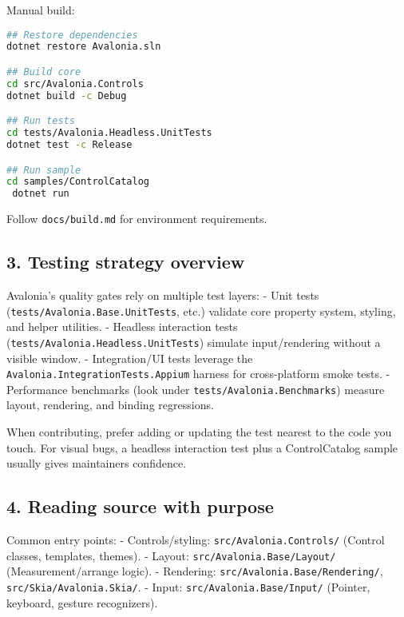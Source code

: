 Manual build:

\begin{lstlisting}[language=bash]
## Restore dependencies
dotnet restore Avalonia.sln

## Build core
cd src/Avalonia.Controls
dotnet build -c Debug

## Run tests
cd tests/Avalonia.Headless.UnitTests
dotnet test -c Release

## Run sample
cd samples/ControlCatalog
 dotnet run
\end{lstlisting}

Follow \passthrough{\lstinline!docs/build.md!} for environment
requirements.

\subsection{3. Testing strategy
overview}\label{testing-strategy-overview}

Avalonia's quality gates rely on multiple test layers: - Unit tests
(\passthrough{\lstinline!tests/Avalonia.Base.UnitTests!}, etc.) validate
core property system, styling, and helper utilities. - Headless
interaction tests
(\passthrough{\lstinline!tests/Avalonia.Headless.UnitTests!}) simulate
input/rendering without a visible window. - Integration/UI tests
leverage the \passthrough{\lstinline!Avalonia.IntegrationTests.Appium!}
harness for cross-platform smoke tests. - Performance benchmarks (look
under \passthrough{\lstinline!tests/Avalonia.Benchmarks!}) measure
layout, rendering, and binding regressions.

When contributing, prefer adding or updating the test nearest to the
code you touch. For visual bugs, a headless interaction test plus a
ControlCatalog sample usually gives maintainers confidence.

\subsection{4. Reading source with
purpose}\label{reading-source-with-purpose}

Common entry points: - Controls/styling:
\passthrough{\lstinline!src/Avalonia.Controls/!} (Control classes,
templates, themes). - Layout:
\passthrough{\lstinline!src/Avalonia.Base/Layout/!} (Measurement/arrange
logic). - Rendering:
\passthrough{\lstinline!src/Avalonia.Base/Rendering/!},
\passthrough{\lstinline!src/Skia/Avalonia.Skia/!}. - Input:
\passthrough{\lstinline!src/Avalonia.Base/Input/!} (Pointer, keyboard,
gesture recognizers).

